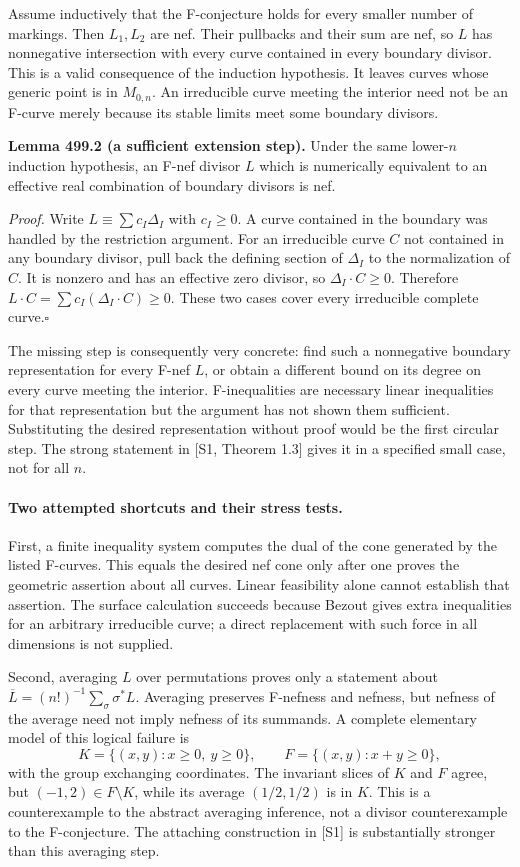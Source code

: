 \documentclass[11pt]{article}
\begin{document}
Assume inductively that the F-conjecture holds for every smaller number
of markings. Then $L_1,L_2$ are nef. Their pullbacks and their sum are
nef, so $L$ has nonnegative intersection with every curve contained in
every boundary divisor. This is a valid consequence of the induction
hypothesis. It leaves curves whose generic point is in $M_{0,n}$.
An irreducible curve meeting the interior need not be an F-curve merely
because its stable limits meet some boundary divisors.

\textbf{Lemma 499.2 (a sufficient extension step).}
Under the same lower-$n$ induction hypothesis, an F-nef divisor $L$ which
is numerically equivalent to an effective real combination of boundary
divisors is nef.

\emph{Proof.}
Write $L\equiv\sum c_I\Delta_I$ with $c_I\ge0$. A curve contained in
the boundary was handled by the restriction argument. For an irreducible
curve $C$ not contained in any boundary divisor, pull back the defining
section of $\Delta_I$ to the normalization of $C$. It is nonzero and has
an effective zero divisor, so $\Delta_I\cdot C\ge0$. Therefore
$L\cdot C=\sum c_I(\Delta_I\cdot C)\ge0$. These two cases cover every
irreducible complete curve.\hfill$\square$

The missing step is consequently very concrete: find such a nonnegative
boundary representation for every F-nef $L$, or obtain a different bound
on its degree on every curve meeting the interior. F-inequalities are
necessary linear inequalities for that representation but the argument
has not shown them sufficient. Substituting the desired representation
without proof would be the first circular step. The strong statement in
[S1, Theorem 1.3] gives it in a specified small case, not for all $n$.

\paragraph{Two attempted shortcuts and their stress tests.}
First, a finite inequality system computes the dual of the cone generated
by the listed F-curves. This equals the desired nef cone only after one
proves the geometric assertion about all curves. Linear feasibility alone
cannot establish that assertion. The surface calculation succeeds because
Bezout gives extra inequalities for an arbitrary irreducible curve; a
direct replacement with such force in all dimensions is not supplied.

Second, averaging $L$ over permutations proves only a statement about
$\overline L=(n!)^{-1}\sum_\sigma\sigma^*L$. Averaging preserves F-nefness
and nefness, but nefness of the average need not imply nefness of its
summands. A complete elementary model of this logical failure is
\[
 K=\{(x,y):x\ge0,\ y\ge0\},\qquad
 F=\{(x,y):x+y\ge0\},
\]
with the group exchanging coordinates. The invariant slices of $K$ and
$F$ agree, but $(-1,2)\in F\setminus K$, while its average
$(1/2,1/2)$ is in $K$. This is a counterexample to the abstract averaging
inference, not a divisor counterexample to the F-conjecture. The attaching
construction in [S1] is substantially stronger than this averaging step.
\end{document}
